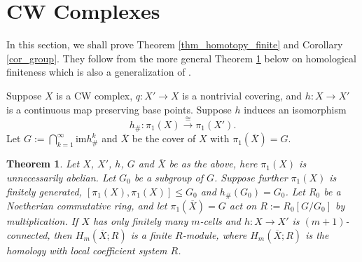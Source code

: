 \documentclass[12pt]{amsart}
\theoremstyle{plain}
\newtheorem{theorem}{Theorem}[section]
\theoremstyle{definition}
\theoremstyle{question}
\theoremstyle{remark}
\theoremstyle{assumption}
\numberwithin{equation}{section}
\theoremstyle{bigthm}
\begin{document}
\section{CW Complexes}\label{sec_CW}
In this section, we shall prove Theorem \ref{thm_homotopy_finite} and Corollary \ref{cor_group}. They follow from the more general Theorem \ref{thm_homology_finite} below on homological finiteness which is also a generalization of \cite[Theorem~3.2]{Qin_Su_Wang}.

Suppose $X$ is a CW complex, $q \colon  X' \rightarrow X$ is a nontrivial covering, and $h \colon  X \rightarrow X'$ is a continuous map preserving base points. Suppose $h$ induces an isomorphism
\[
h_{\#} \colon  \pi_{1} (X) \overset{\cong}{\rightarrow} \pi_{1} (X').
\]
Let $G := \bigcap_{k=1}^{\infty} \mathrm{im} h_{\#}^{k}$ and $\overline{X}$ be the cover of $X$ with $\pi_{1} (\overline{X}) =G$.
\begin{theorem}\label{thm_homology_finite}
Let $X$, $X'$, $h$, $G$ and $\overline{X}$ be as the above, here $\pi_{1} (X)$ is unnecessarily abelian. Let $G_{0}$ be a subgroup of $G$. Suppose further $\pi_{1} (X)$ is finitely generated, $[\pi_{1} (X), \pi_{1} (X)] \le G_{0}$ and $h_{\#} (G_{0}) = G_{0}$. Let $R_{0}$ be a Noetherian commutative ring, and let $\pi_{1} (\overline{X}) =G$ act on $R:= R_{0} [G/G_{0}]$ by multiplication. If $X$ has only finitely many $m$-cells and $h \colon  X \rightarrow X'$ is $(m+1)$-connected, then $H_{m} (\overline{X};R)$ is a finite $R$-module, where $H_{m} (\overline{X};R)$ is the homology with local coefficient system $R$.
\end{theorem}
\end{document}
